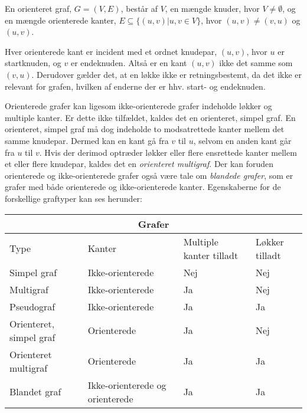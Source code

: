 \begin{defn}  
En orienteret graf, $G=(V,E)$, består af $V$, en mængde knuder, hvor $V \neq \emptyset$, og en mængde orienterede kanter, $E \subseteq \{(u,v)|u,v \in V\}$, hvor $(u,v) \neq (v,u)$ og $(u,v)$. 
\end{defn}

Hver orienterede kant er incident med et ordnet knudepar, $(u,v)$, hvor $u$ er startknuden, og $v$ er endeknuden. Altså er en kant $(u,v)$ ikke det samme som $(v,u)$.
Derudover gælder det, at en løkke ikke er retningsbestemt, da det ikke er relevant for grafen, hvilken af enderne der er hhv. start- og endeknuden.



Orienterede grafer kan ligesom ikke-orienterede grafer indeholde løkker og multiple kanter. Er dette ikke tilfældet, kaldes det en orienteret, simpel graf. En orienteret, simpel graf må dog indeholde to modsatrettede kanter mellem det samme knudepar. Dermed kan en kant gå fra $v$ til $u$, selvom en anden kant går fra $u$ til $v$. Hvis der derimod optræder løkker eller flere ensrettede kanter mellem et eller flere knudepar, kaldes det en \emph{orienteret multigraf}. 
Der kan foruden orienterede og ikke-orienterede grafer også være tale om \emph{blandede grafer}, som er grafer med både orienterede og ikke-orienterede kanter.  
Egenskaberne for de forskellige graftyper kan ses herunder:


\begin{center} \label{tab:typer}
\begin{tabular}{ |p{4cm}|p{3cm}|p{3cm}|p{2cm}|  }
 \hline
 \multicolumn{4}{|c|}{Grafer} \\
 \hline
 Type & Kanter & Multiple kanter tilladt & Løkker tilladt\\
 \hline
 Simpel graf   & Ikke-orienterede    & Nej &   Nej\\
 Multigraf &   Ikke-orienterede & Ja   & Nej\\
 Pseudograf & Ikke-orienterede & Ja &  Ja\\
 Orienteret, simpel graf    & Orienterede & Ja \footnotemark &  Nej\\
 Orienteret multigraf &  Orienterede  & Ja & Ja\\
 Blandet graf & Ikke-orienterede og orienterede  & Ja   & Ja\\
 \hline
\end{tabular}
\end{center}


